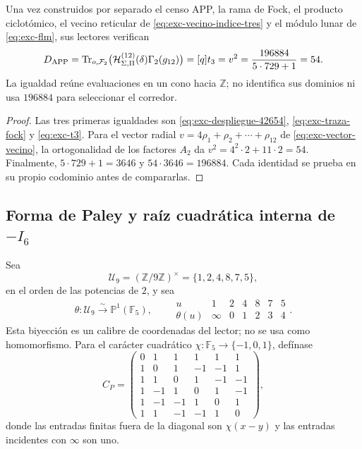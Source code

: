 \begin{theorem}
\label{thm:exc-cono-54}
Una vez construidos por separado el censo APP, la rama de Fock, el producto
ciclotómico, el vecino reticular de
\cref{eq:exc-vecino-indice-tres} y el módulo lunar de
\cref{eq:exc-flm}, sus lectores verifican
\begin{equation}
 D_{\rm APP}
 =\operatorname{Tr}_{o,\mathcal F_2}
  \bigl(\mathcal H_{\Sigma,\Pi}^{(12)}(\delta)\Gamma_2(g_{12})\bigr)
 =[q]t_3=v^2=\frac{196884}{5\cdot729+1}=54.
 \label{eq:exc-cono-54}
\end{equation}
La igualdad reúne evaluaciones en un cono hacia \(\mathbb Z\); no
identifica sus dominios ni usa \(196884\) para seleccionar el corredor.
\end{theorem}

\begin{proof}
Las tres primeras igualdades son
\eqref{eq:exc-despliegue-42654}, \eqref{eq:exc-traza-fock} y
\eqref{eq:exc-t3}. Para el vector radial
\(v=4\rho_1+\rho_2+\cdots+\rho_{12}\) de
\eqref{eq:exc-vector-vecino}, la ortogonalidad de los factores \(A_2\) da
\(v^2=4^2\cdot2+11\cdot2=54\). Finalmente,
\(5\cdot729+1=3646\) y \(54\cdot3646=196884\). Cada identidad se prueba en
su propio codominio antes de compararlas.
\end{proof}

\subsection{\texorpdfstring{Forma de Paley y raíz cuadrática interna de \(-I_6\)}{Forma de Paley y raíz cuadrática interna de -I6}}

Sea
\[
 \mathcal U_9=(\mathbb Z/9\mathbb Z)^\times=\{1,2,4,8,7,5\},
\]
en el orden de las potencias de \(2\), y sea
\begin{equation}
 \theta:\mathcal U_9\xrightarrow{\sim}\mathbb P^1(\mathbb F_5),
 \qquad
 \begin{array}{c|cccccc}
 u&1&2&4&8&7&5\\ \hline
 \theta(u)&\infty&0&1&2&3&4
 \end{array}.
 \label{eq:exc-calibre-proyectivo}
\end{equation}
Esta biyección es un calibre de coordenadas del lector; no se usa como
homomorfismo. Para el carácter cuadrático
\(\chi:\mathbb F_5\to\{-1,0,1\}\), defínase
\begin{equation}
 C_P=
 \begin{pmatrix}
 0& 1& 1& 1& 1& 1\\
 1& 0& 1&-1&-1& 1\\
 1& 1& 0& 1&-1&-1\\
 1&-1& 1& 0& 1&-1\\
 1&-1&-1& 1& 0& 1\\
 1& 1&-1&-1& 1& 0
 \end{pmatrix},
 \label{eq:exc-matriz-paley}
\end{equation}
donde las entradas finitas fuera de la diagonal son \(\chi(x-y)\) y las
entradas incidentes con \(\infty\) son uno.

